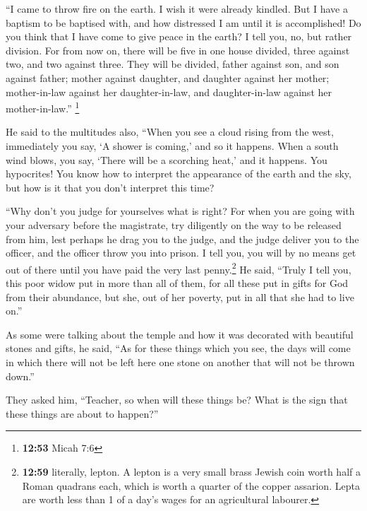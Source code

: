  ``I came to throw fire on the earth. I wish it were
already kindled.  But I have a baptism to be baptised
with, and how distressed I am until it is accomplished! 
Do you think that I have come to give peace in the earth? I tell you,
no, but rather division.  For from now on, there will be
five in one house divided, three against two, and two against three.
 They will be divided, father against son, and son
against father; mother against daughter, and daughter against her
mother; mother-in-law against her daughter-in-law, and daughter-in-law
against her mother-in-law.'' \footnote{\textbf{12:53} Micah 7:6}

 He said to the multitudes also, ``When you see a cloud
rising from the west, immediately you say, `A shower is coming,' and so
it happens.  When a south wind blows, you say, `There
will be a scorching heat,' and it happens.  You
hypocrites! You know how to interpret the appearance of the earth and
the sky, but how is it that you don't interpret this time?

 ``Why don't you judge for yourselves what is right?
 For when you are going with your adversary before the
magistrate, try diligently on the way to be released from him, lest
perhaps he drag you to the judge, and the judge deliver you to the
officer, and the officer throw you into prison.  I tell
you, you will by no means get out of there until you have paid the very
last penny.\footnote{\textbf{12:59} literally, lepton. A lepton is a
  very small brass Jewish coin worth half a Roman quadrans each, which
  is worth a quarter of the copper assarion. Lepta are worth less than 1
  of a day's wages for an agricultural labourer.}  He
said, ``Truly I tell you, this poor widow put in more than all of them,
 for all these put in gifts for God from their abundance,
but she, out of her poverty, put in all that she had to live on.''

 As some were talking about the temple and how it was
decorated with beautiful stones and gifts, he said,  ``As
for these things which you see, the days will come in which there will
not be left here one stone on another that will not be thrown down.''

 They asked him, ``Teacher, so when will these things be?
What is the sign that these things are about to happen?''

